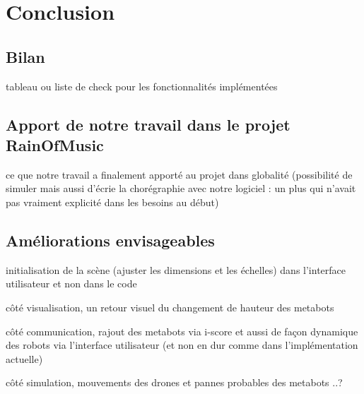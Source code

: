 \section{Conclusion}
\subsection{Bilan}
tableau ou liste de check pour les fonctionnalités implémentées

\subsection{Apport de notre travail dans le projet RainOfMusic}
ce que notre travail a finalement apporté au projet dans globalité (possibilité de simuler mais aussi d'écrie la chorégraphie avec notre logiciel : un plus qui n'avait pas vraiment explicité dans les besoins au début)

\subsection{Améliorations envisageables}
initialisation de la scène (ajuster les dimensions et les échelles) dans l'interface utilisateur et non dans le code 

côté visualisation, un retour visuel du changement de hauteur des metabots 

côté communication, rajout des metabots via i-score et aussi de façon dynamique des robots via l'interface utilisateur (et non en dur comme dans l'implémentation actuelle)

côté simulation, mouvements des drones et pannes probables des metabots ..?




